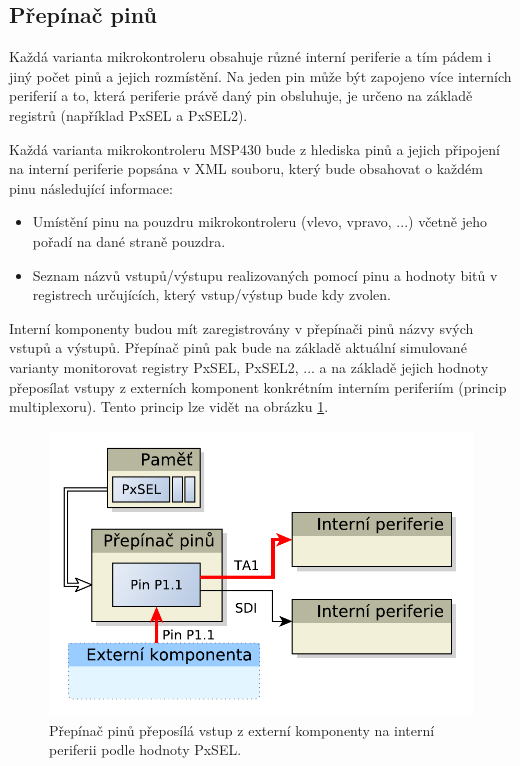 \subsection{Přepínač pinů}

Každá varianta mikrokontroleru obsahuje různé interní periferie a tím pádem i jiný počet pinů a jejich rozmístění. Na jeden pin může být zapojeno více interních periferií a to, která periferie právě daný pin obsluhuje, je určeno na základě registrů (například PxSEL a PxSEL2).

Každá varianta mikrokontroleru MSP430 bude z hlediska pinů a jejich připojení na interní periferie popsána v XML souboru, který bude obsahovat o každém
pinu následující informace:

\begin{itemize}
\item Umístění pinu na pouzdru mikrokontroleru (vlevo, vpravo, ...) včetně jeho pořadí na dané straně pouzdra.
\item Seznam názvů vstupů/výstupu realizovaných pomocí pinu a hodnoty bitů v registrech určujících, který vstup/výstup bude kdy zvolen.
\end{itemize}


Interní komponenty budou mít zaregistrovány v přepínači pinů názvy svých vstupů a výstupů.
Přepínač pinů pak bude na základě aktuální simulované varianty monitorovat registry PxSEL, PxSEL2, ... a na základě jejich hodnoty přeposílat vstupy z externích komponent konkrétním interním periferiím (princip multiplexoru). Tento princip lze vidět na obrázku \ref{fig:msp430_pinmult}.

\begin{figure}[h]
\centering
\includegraphics[trim=0cm 0cm 0cm 0cm, scale=0.7]{fig/msp430_pinmult}
\caption{Přepínač pinů přeposílá vstup z externí komponenty na interní periferii podle hodnoty PxSEL.}
\label{fig:msp430_pinmult}
\end{figure}

